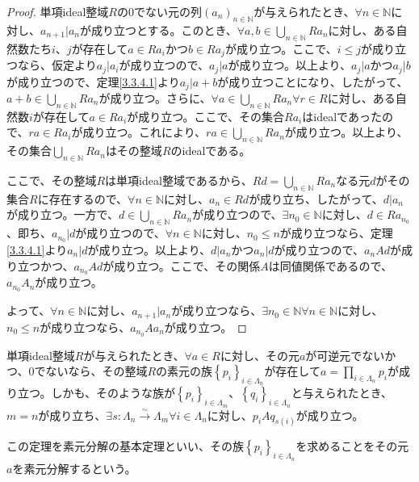 \documentclass[dvipdfmx]{jsarticle}
\begin{document}
\begin{proof}
単項ideal整域$R$の0でない元の列$\left( a_{n} \right)_{n \in \mathbb{N}}$が与えられたとき、$\forall n \in \mathbb{N}$に対し、$a_{n + 1}|a_{n}$が成り立つとする。このとき、$\forall a,b \in \bigcup_{n \in \mathbb{N}} {Ra_{n}}$に対し、ある自然数たち$i$、$j$が存在して$a \in Ra_{i}$かつ$b \in Ra_{j}$が成り立つ。ここで、$i \leq j$が成り立つなら、仮定より$a_{j}|a_{i}$が成り立つので、$a_{j}|a$が成り立つ。以上より、$a_{j}|a$かつ$a_{j}|b$が成り立つので、定理\ref{3.3.4.1}より$a_{j}|a + b$が成り立つことになり、したがって、$a + b \in \bigcup_{n \in \mathbb{N}} {Ra_{n}}$が成り立つ。さらに、$\forall a \in \bigcup_{n \in \mathbb{N}} {Ra_{n}}\forall r \in R$に対し、ある自然数$i$が存在して$a \in Ra_{i}$が成り立つ。ここで、その集合$Ra_{i}$はidealであったので、$ra \in Ra_{i}$が成り立つ。これにより、$ra \in \bigcup_{n \in \mathbb{N}} {Ra_{n}}$が成り立つ。以上より、その集合$\bigcup_{n \in \mathbb{N}} {Ra_{n}}$はその整域$R$のidealである。\par
ここで、その整域$R$は単項ideal整域であるから、$Rd = \bigcup_{n \in \mathbb{N}} {Ra_{n}}$なる元$d$がその集合$R$に存在するので、$\forall n \in \mathbb{N}$に対し、$a_{n} \in Rd$が成り立ち、したがって、$d|a_{n}$が成り立つ。一方で、$d \in \bigcup_{n \in \mathbb{N}} {Ra_{n}}$が成り立つので、$\exists n_{0} \in \mathbb{N}$に対し、$d \in Ra_{n_{0}}$、即ち、$a_{n_{0}}|d$が成り立つので、$\forall n \in \mathbb{N}$に対し、$n_{0} \leq n$が成り立つなら、定理\ref{3.3.4.1}より$a_{n}|d$が成り立つ。以上より、$d|a_{n}$かつ$a_{n}|d$が成り立つので、$a_{n}Ad$が成り立つかつ、$a_{n_{0}}Ad$が成り立つ。ここで、その関係$A$は同値関係であるので、$a_{n_{0}}A_{n}$が成り立つ。\par
よって、$\forall n \in \mathbb{N}$に対し、$a_{n + 1}|a_{n}$が成り立つなら、$\exists n_{0} \in \mathbb{N}\forall n \in \mathbb{N}$に対し、$n_{0} \leq n$が成り立つなら、$a_{n_{0}}Aa_{n}$が成り立つ。
\end{proof}
\begin{thm}[素元分解の基本定理]\label{3.3.4.11}
単項ideal整域$R$が与えられたとき、$\forall a \in R$に対し、その元$a$が可逆元でないかつ、$0$でないなら、その整域$R$の素元の族$\left\{ p_{i} \right\}_{i \in \varLambda_{n}}$が存在して$a = \prod_{i \in \varLambda_{n}} p_{i}$が成り立つ。しかも、そのような族が$\left\{ p_{i} \right\}_{i \in \varLambda_{m}}$、$\left\{ q_{i} \right\}_{i \in \varLambda_{n}}$と与えられたとき、$m = n$が成り立ち、$\exists s:\varLambda_{n}\overset{\sim}{\rightarrow}\varLambda_{m}\forall i \in \varLambda_{n}$に対し、$p_{i}Aq_{s(i)}$が成り立つ。\par
この定理を素元分解の基本定理といい、その族$\left\{ p_{i} \right\}_{i \in \varLambda_{n}}$を求めることをその元$a$を素元分解するという。
\end{thm}
\end{document}
